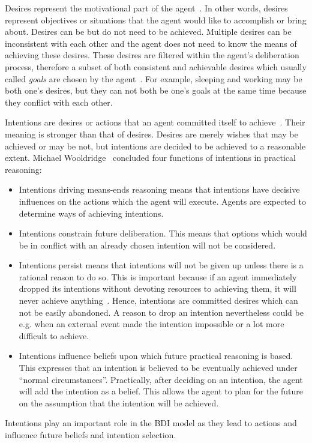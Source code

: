 Desires represent the motivational part of the agent~\cite{Rao_BDITheory_1995}.
In other words, desires represent objectives or situations that the agent would like to accomplish or bring about.
Desires can be but do not need to be achieved.
Multiple desires can be inconsistent with each other and the agent does not need to know the means of achieving these desires.
These desires are filtered within the agent's deliberation process, therefore a subset of both consistent and achievable desires which usually called \emph{goals} are chosen by the agent~\cite{Gerhard_MultiSystem_1999}.
For example, sleeping and working may be both one's desires, but they can not both be one's goals at the same time because they conflict with each other.

Intentions are desires or actions that an agent committed itself to achieve~\cite{Alejandro_LearnBDI_2004}.
Their meaning is stronger than that of desires.
Desires are merely wishes that may be achieved or may be not, but intentions are decided to be achieved to a reasonable extent.
Michael Wooldridge~\cite{Gerhard_MultiSystem_1999} concluded four functions of intentions in practical reasoning:
\begin{itemize}
  \item Intentions driving means-ends reasoning means that intentions have decisive influences on the actions which the agent will execute.
    Agents are expected to determine ways of achieving intentions.
  \item Intentions constrain future deliberation.
    This means that options which would be in conflict with an already chosen intention will not be considered.
  \item Intentions persist means that intentions will not be given up unless there is a rational reason to do so.
    This is important because if an agent immediately dropped its intentions without devoting resources to achieving them, it will never achieve anything~\cite{Gerhard_MultiSystem_1999}.
    Hence, intentions are committed desires which can not be easily abandoned.
    A reason to drop an intention nevertheless could be e.g. when an external event made the intention impossible or a lot more difficult to achieve.
  \item Intentions influence beliefs upon which future practical reasoning is based.
    This expresses that an intention is believed to be eventually achieved under \enquote{normal circumstances}.
    Practically, after deciding on an intention, the agent will add the intention as a belief.
    This allows the agent to plan for the future on the assumption that the intention will be achieved.
\end{itemize}
Intentions play an important role in the BDI model as they lead to actions and influence future beliefs and intention selection.

